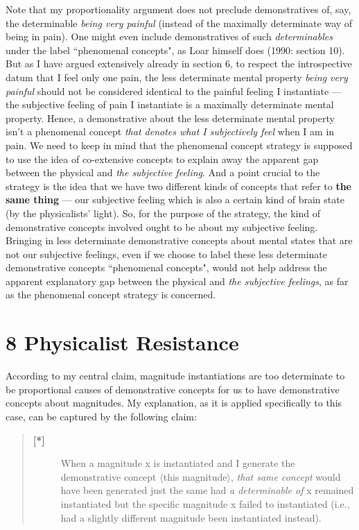 \documentclass[a4paper,12pt]{article}
\begin{document}
Note that my proportionality argument does not preclude demonstratives of, say, the determinable \emph{being very painful} (instead of the maximally determinate way of being in pain). One might even include demonstratives of such \emph{determinables} under the label ``phenomenal concepts", as Loar himself does (1990: section 10). But as I have argued extensively already in section 6, to respect the introspective datum that I feel only one pain, the less determinate mental property \emph{being very painful} should not be considered identical to the painful feeling I instantiate --- the subjective feeling of pain I instantiate is a maximally determinate mental property. Hence, a demonstrative about the less determinate mental property isn't a phenomenal concept \emph{that denotes what I subjectively feel} when I am in pain. We need to keep in mind that the phenomenal concept strategy is supposed to use the idea of co-extensive concepts to explain away the apparent gap between the physical and \emph{the subjective feeling}. And a point crucial to the strategy is the idea that we have two different kinds of concepts that refer to \textbf{the same thing} --- our subjective feeling which is also a certain kind of brain state (by the physicalists' light). So, for the purpose of the strategy, the kind of demonstrative concepts involved ought to be about my subjective feeling. Bringing in less determinate demonstrative concepts about mental states that are not our subjective feelings, even if we choose to label these less determinate demonstrative concepts ``phenomenal concepts", would not help address the apparent explanatory gap between the physical and \emph{the subjective feelings}, as far as the phenomenal concept strategy is concerned.

\section*{8 Physicalist Resistance}
According to my central claim, magnitude instantiations are too determinate to be proportional causes of demonstrative concepts for us to have demonstrative concepts about magnitudes. My explanation, as it is applied specifically to this case, can be captured by the following claim:

\begin{quote}
\begin{description}
\item[\textbf{[*]}] When a magnitude x is instantiated and I generate the demonstrative concept $\langle$this magnitude$\rangle$, \emph{that same concept} would have been generated just the same had \emph{a determinable of} x remained instantiated but the specific magnitude x failed to instantiated (i.e., had a slightly different magnitude been instantiated instead).
\end{description}
\end{quote}
\end{document}

